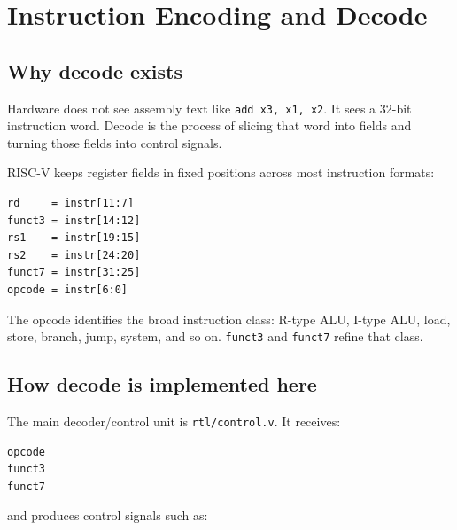 \section{Instruction Encoding and Decode}

\subsection{Why decode exists}

Hardware does not see assembly text like \texttt{add x3, x1, x2}. It sees a 32-bit instruction word. Decode is the process of slicing that word into fields and turning those fields into control signals.

RISC-V keeps register fields in fixed positions across most instruction formats:

\begin{lstlisting}[language={}]
rd     = instr[11:7]
funct3 = instr[14:12]
rs1    = instr[19:15]
rs2    = instr[24:20]
funct7 = instr[31:25]
opcode = instr[6:0]
\end{lstlisting}

The opcode identifies the broad instruction class: R-type ALU, I-type ALU, load, store, branch, jump, system, and so on. \texttt{funct3} and \texttt{funct7} refine that class.

\subsection{How decode is implemented here}

The main decoder/control unit is \texttt{rtl/control.v}. It receives:

\begin{lstlisting}[language={}]
opcode
funct3
funct7
\end{lstlisting}

and produces control signals such as:

